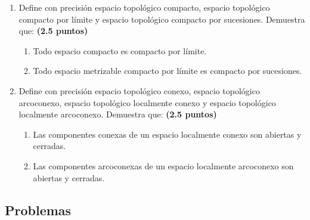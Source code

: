 \begin{enumerate}
    \item Define con precisión espacio topológico compacto, espacio topológico compacto por límite y espacio topológico compacto por sucesiones. Demuestra que:
    \hfill \textbf{(2.5 puntos)}
    \begin{enumerate}
        \item Todo espacio compacto es compacto por límite.
        \item Todo espacio metrizable compacto por límite es compacto por sucesiones.
    \end{enumerate}

    \item Define con precisión espacio topológico conexo, espacio topológico arcoconexo, espacio topológico localmente conexo y espacio topológico localmente arcoconexo. Demuestra que:
    \hfill \textbf{(2.5 puntos)}
    \begin{enumerate}
        \item Las componentes conexas de un espacio localmente conexo son abiertas y cerradas.
        \item Las componentes arcoconexas de un espacio localmente arcoconexo son abiertas y cerradas.
    \end{enumerate}
\end{enumerate}

\subsection{Problemas}


